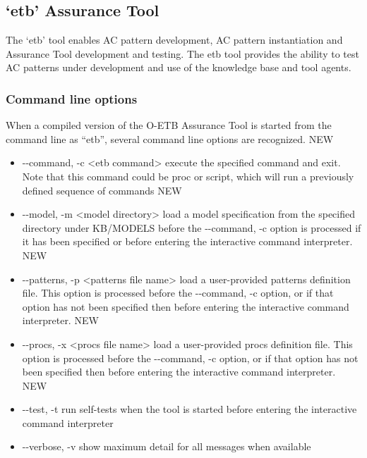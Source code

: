 \documentclass[12pt,twoside,a4paper]{article}
\begin{document}
\hypertarget{etb-assurance-tool}{%
\subsection{`etb' Assurance Tool}\label{etb-assurance-tool}}

The `etb' tool enables AC pattern development, AC pattern instantiation and Assurance Tool development and testing. The etb tool provides the ability to test AC patterns under development and use of the knowledge base and tool agents.

\hypertarget{command-line-options}{%
\subsubsection{Command line options}\label{command-line-options}}

When a compiled version of the O-ETB Assurance Tool is started from the command line as ``etb'', several command line options are recognized. NEW

\begin{itemize}
\item
  -\/-command, -c \textless etb command\textgreater{} execute the specified command and exit. Note that this command could be proc or script, which will run a previously defined sequence of commands NEW
\item
  -\/-model, -m \textless model directory\textgreater{} load a model specification from the specified directory under KB/MODELS before the -\/-command, -c option is processed if it has been specified or before entering the interactive command interpreter. NEW
\item
  -\/-patterns, -p \textless patterns file name\textgreater{} load a user-provided patterns definition file. This option is processed before the -\/-command, -c option, or if that option has not been specified then before entering the interactive command interpreter. NEW
\item
  -\/-procs, -x \textless procs file name\textgreater{} load a user-provided procs definition file. This option is processed before the -\/-command, -c option, or if that option has not been specified then before entering the interactive command interpreter. NEW
\item
  -\/-test, -t run self-tests when the tool is started before entering the interactive command interpreter
\item
  -\/-verbose, -v show maximum detail for all messages when available
\end{itemize}
\end{document}
